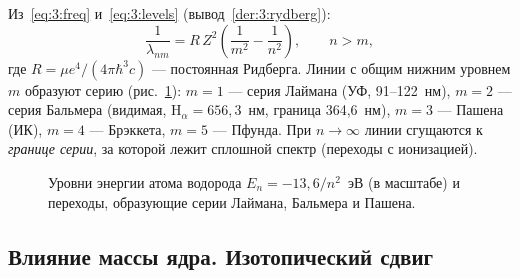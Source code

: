 Из~\eqref{eq:3:freq} и~\eqref{eq:3:levels} (вывод~\ref{der:3:rydberg}):
\begin{equation}\label{eq:3:rydberg}
  \frac{1}{\lambda_{nm}}=R\,Z^2\left(\frac{1}{m^2}-\frac{1}{n^2}\right),\qquad n>m,
\end{equation}
где $R=\mu e^4/(4\pi\hbar^3c)$ — постоянная Ридберга. Линии с общим нижним уровнем $m$
образуют серию (рис.~\ref{fig:3:levels}): $m=1$ — серия Лаймана (УФ, 91--122~нм),
$m=2$ — серия Бальмера (видимая, $\mathrm H_\alpha=656{,}3$~нм, граница 364,6~нм),
$m=3$ — Пашена (ИК), $m=4$ — Брэккета, $m=5$ — Пфунда. При $n\to\infty$ линии сгущаются к
\emph{границе серии}, за которой лежит сплошной спектр (переходы с ионизацией).

\begin{figure}[htbp]
\centering
{}
\caption{Уровни энергии атома водорода $E_n=-13{,}6/n^2$~эВ (в масштабе) и переходы,
образующие серии Лаймана, Бальмера и Пашена.}
\label{fig:3:levels}
\end{figure}

\subsection{Влияние массы ядра. Изотопический сдвиг}

